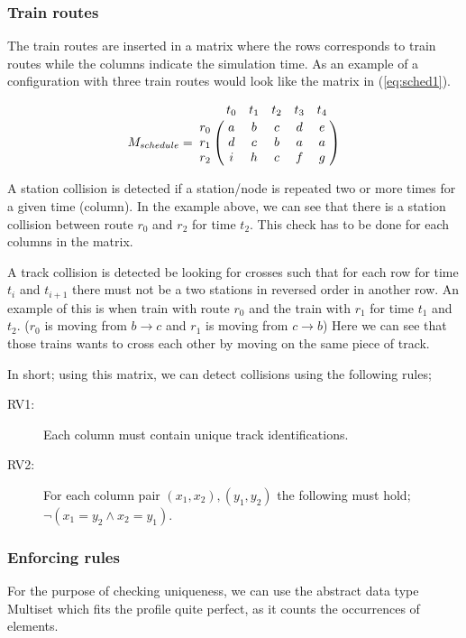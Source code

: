 \documentclass[10pt,a4paper]{article}
\let\bbordermatrix\bordermatrix
\begin{document}
\subsubsection{Train routes}
 
The train routes are inserted in a matrix where the rows corresponds to train routes while the columns indicate the simulation time.
As an example of a configuration with three train routes would look like the matrix in (\ref{eq:sched1}).

\begin{equation}
M_{schedule} = \bbordermatrix{
                    ~ & t_0 & t_1 & t_2 & t_3 & t_4 \cr
                  r_0 & a   & b   & c   & d   & e\cr
                  r_1 & d   & c   & b   & a   & a\cr
                  r_2 & i   & h   & c   & f   & g}
\label{eq:sched1}
\end{equation}

A station collision is detected if a station/node is repeated two or more times for a given time (column).
In the example above, we can see that there is a station collision between route $r_0$ and $r_2$ for time $t_2$.
This check has to be done for each columns in the matrix.
 
A track collision is detected be looking for crosses such that for each row for time $t_i$ and $t_{i+1}$ there must not be a two stations in reversed order in another row.
An example of this is when train with route $r_0$ and the train with $r_1$ for time $t_1$ and $t_2$. ($r_0$ is moving from $b \rightarrow c$ and $r_1$ is moving from $ c \rightarrow b $) Here we can see that those trains wants to cross each other by moving on the same piece of track.  

In short; using this matrix, we can detect collisions using the following rules;

\begin{description}
  \item[RV1:] Each column must contain unique track identifications.
  \item[RV2:] For each column pair $\left( x_1,x_2 \right), \left( y_1,y_2 \right)$ the following must hold;\\ $\lnot\left(x_1 = y_2 \land x_2 = y_1\right)$.
\end{description}

\subsubsection{Enforcing rules}
For the purpose of checking uniqueness, we can use the abstract data type Multiset which fits the profile quite perfect, as it counts the occurrences of elements. 
\end{document}
